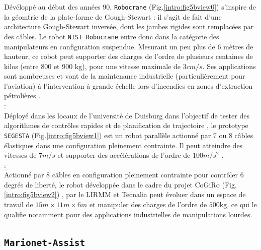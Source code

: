 D\'ev\'elopp\'e au d\'ebut des ann\'ees 90, {\tt Robocrane} 
\cite{journals/jfr/AlbusBD93} (Fig.\ref{intro:fig5bview0}) s'inspire de la 
g\'eom\'trie de la plate-forme de Gough-Stewart : il s'agit de fait d'une 
architecture Gough-Stewart invers\'ee, dont les jambes rigides sont remplac\'ees 
par des c\^ables. Le robot {\tt NIST Robocrane} entre donc dans la 
cat\'egorie des manipulateurs en configuration suspendue. Mesurant un peu 
plus de 6 m\`etres de hauteur, ce robot peut supporter des charges de l'ordre 
de plusieurs centaines de kilos (entre 800 et 900 kg), pour une vitesse maximale 
de $3cm/s$. Ses applications sont nombreuses et vont de la maintenance 
industrielle (particuli\`erement pour l'aviation) \`a l'intervention à grande 
\'echelle lors d'incendies en zones d'extraction p\'etrolières 
\cite{bostelman1994}\cite{bostelman1997emma}. \\

 :\\

D\'eploy\'e dans les locaux de l'universit\'e de Duisburg dans l'objectif de 
tester des algorithmes de contr\^oles rapides et de planification de 
trajectoire \cite{hiller2005}, le prototype {\tt SEGESTA} 
(Fig.\ref{intro:fig5bview1}) est un robot parall\`ele actionn\'e par 7 
ou 8 c\^ables \'elastiques dans une configuration pleinement contrainte. Il 
peut atteindre des vitesses de $7m/s$ et supporter des acc\'el\'erations de 
l'ordre de $100m/s^2$ \cite{bruckmann2006modular}. \\

 :\\

Actionn\'e par 8 c\^ables en configuration pleinement contrainte pour 
contr\^oler 6 degr\'es de libert\'e, le robot d\'evelopp\'ee dans le cadre du 
projet CoGiRo (Fig.\ref{intro:fig5bview2}) \cite{alexandre2012}, 
\cite{dallej2012} par le LIRMM et Tecnalia peut \'evoluer dans 
un espace de travail de $15m \times 11m \times 6m$ et manipuler des charges de 
l'ordre de $500$kg, ce qui le qualifie notamment pour des applications 
industrielles de manipulations lourdes. \\


\subsection{{\tt Marionet-Assist}} \label{chap0-1-1}

